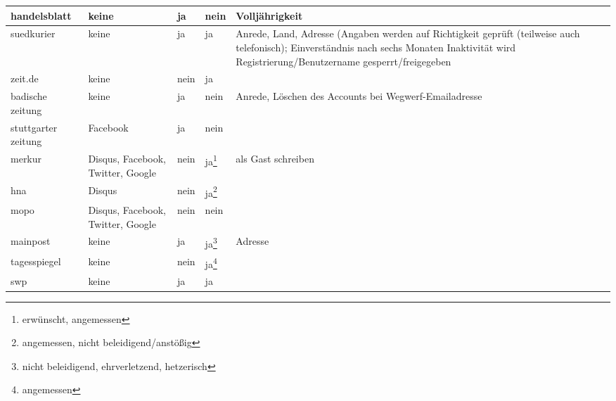 \begin{landscape}
\begin{longtable}{l|p{28mm}p{20mm}p{20mm}p{90mm}}
  handelsblatt & %
    keine & ja & nein &
    Volljährigkeit \\\hline

  suedkurier & %
    keine & ja & ja &
    Anrede, Land, Adresse (Angaben werden auf Richtigkeit geprüft (teilweise
    auch telefonisch); Einverständnis nach sechs Monaten Inaktivität wird
    Registrierung/Benutzername gesperrt/freigegeben \\\hline

  zeit.de & %
    keine & nein & ja &
    \\\hline

  badische zeitung & %
    keine & ja & nein &
    Anrede, Löschen des Accounts bei Wegwerf-Emailadresse
    \\\hline

  stuttgarter zeitung & %
    Facebook & ja & nein &
    \\\hline

  merkur & %
    Disqus, Facebook, Twitter, Google & nein & ja\footnote{erwünscht, angemessen} &
    als Gast schreiben \\\hline

  hna & %
    Disqus & nein & ja\footnote{angemessen, nicht beleidigend/anstößig} &
    \\\hline

  mopo & %
    Disqus, Facebook, Twitter, Google & nein & nein &
    \\\hline

  mainpost & %
    keine & ja & ja\footnote{nicht beleidigend, ehrverletzend, hetzerisch} &
    Adresse \\\hline

  tagesspiegel & %
    keine & nein & ja\footnote{angemessen} &
    \\\hline

  swp & %
    keine & ja & ja &
    \\ \hline

\end{longtable}
\end{landscape}

